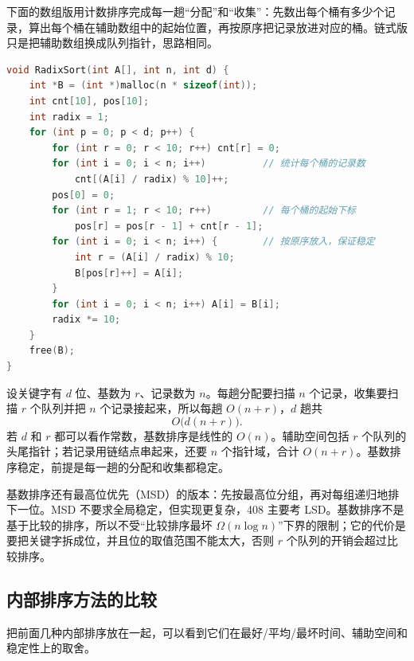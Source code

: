 下面的数组版用计数排序完成每一趟“分配”和“收集”：先数出每个桶有多少个记录，算出每个桶在辅助数组中的起始位置，再按原序把记录放进对应的桶。链式版只是把辅助数组换成队列指针，思路相同。

\newpage
\begin{lstlisting}[language=C]
void RadixSort(int A[], int n, int d) {
    int *B = (int *)malloc(n * sizeof(int));
    int cnt[10], pos[10];
    int radix = 1;
    for (int p = 0; p < d; p++) {
        for (int r = 0; r < 10; r++) cnt[r] = 0;
        for (int i = 0; i < n; i++)          // 统计每个桶的记录数
            cnt[(A[i] / radix) % 10]++;
        pos[0] = 0;
        for (int r = 1; r < 10; r++)         // 每个桶的起始下标
            pos[r] = pos[r - 1] + cnt[r - 1];
        for (int i = 0; i < n; i++) {        // 按原序放入，保证稳定
            int r = (A[i] / radix) % 10;
            B[pos[r]++] = A[i];
        }
        for (int i = 0; i < n; i++) A[i] = B[i];
        radix *= 10;
    }
    free(B);
}
\end{lstlisting}

设关键字有 $d$ 位、基数为 $r$、记录数为 $n$。每趟分配要扫描 $n$ 个记录，收集要扫描 $r$ 个队列并把 $n$ 个记录接起来，所以每趟 $O(n+r)$，$d$ 趟共
\[
O\bigl(d(n+r)\bigr).
\]
若 $d$ 和 $r$ 都可以看作常数，基数排序是线性的 $O(n)$。辅助空间包括 $r$ 个队列的头尾指针；若记录用链结点串起来，还要 $n$ 个指针域，合计 $O(n+r)$。基数排序稳定，前提是每一趟的分配和收集都稳定。

基数排序还有最高位优先（MSD）的版本：先按最高位分组，再对每组递归地排下一位。MSD 不要求全局稳定，但实现更复杂，408 主要考 LSD。基数排序不是基于比较的排序，所以不受“比较排序最坏 $\Omega(n\log n)$”下界的限制；它的代价是要把关键字拆成位，并且位的取值范围不能太大，否则 $r$ 个队列的开销会超过比较排序。

\subsection{内部排序方法的比较}

把前面几种内部排序放在一起，可以看到它们在最好/平均/最坏时间、辅助空间和稳定性上的取舍。

